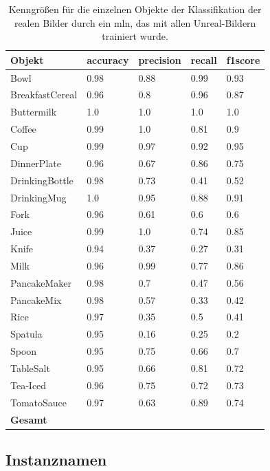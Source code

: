 \begin{table}
\begin{tabularx}{\textwidth}{Xllll}
\textbf{Objekt}	& \textbf{\gls{accuracy}} & \textbf{\gls{precision}}	& \textbf{\gls{recall}}	& \textbf{\gls{f1score}} \\ \hline
Bowl & 0.98 & 0.88 & 0.99 & 0.93 \\  
BreakfastCereal & 0.96 & 0.8 & 0.96 & 0.87 \\  
Buttermilk & 1.0 & 1.0 & 1.0 & 1.0 \\  
Coffee & 0.99 & 1.0 & 0.81 & 0.9 \\  
Cup & 0.99 & 0.97 & 0.92 & 0.95 \\  
DinnerPlate & 0.96 & 0.67 & 0.86 & 0.75 \\  
DrinkingBottle & 0.98 & 0.73 & 0.41 & 0.52 \\  
DrinkingMug & 1.0 & 0.95 & 0.88 & 0.91 \\  
Fork & 0.96 & 0.61 & 0.6 & 0.6 \\  
Juice & 0.99 & 1.0 & 0.74 & 0.85 \\  
Knife & 0.94 & 0.37 & 0.27 & 0.31 \\  
Milk & 0.96 & 0.99 & 0.77 & 0.86 \\  
PancakeMaker & 0.98 & 0.7 & 0.47 & 0.56 \\  
PancakeMix & 0.98 & 0.57 & 0.33 & 0.42 \\  
Rice & 0.97 & 0.35 & 0.5 & 0.41 \\  
Spatula & 0.95 & 0.16 & 0.25 & 0.2 \\  
Spoon & 0.95 & 0.75 & 0.66 & 0.7 \\  
TableSalt & 0.95 & 0.66 & 0.81 & 0.72 \\  
Tea-Iced & 0.96 & 0.75 & 0.72 & 0.73 \\  
TomatoSauce & 0.97 & 0.63 & 0.89 & 0.74 \\   \hline
\textbf{Gesamt}		&	   &	  &      &       \\
\end{tabularx}
\caption[Objekt-spezifische Kenngrößen der Klassifikation mit Unreal-Trainingsset und Real-Testset]{Kenngrößen für die einzelnen Objekte der Klassifikation der realen Bilder durch ein \gls{mln}, das mit allen Unreal-Bildern trainiert wurde.}
\label{tab:UnrealRealGTClass_metrics}
\end{table}

\subsection{Instanznamen}

